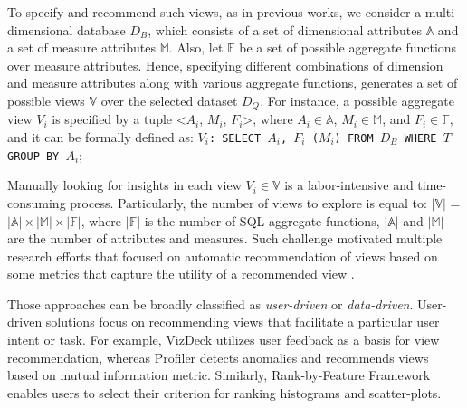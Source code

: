 To specify and recommend such views, as in previous works, we consider a multi-dimensional database $D_B$, which consists of a set of dimensional attributes $\mathbb{A}$ and a set of measure attributes $\mathbb{M}$. 
%
Also, let $\mathbb{F}$ be a set of possible aggregate functions over measure attributes. %
%
Hence, specifying different combinations of dimension and measure attributes along with various aggregate functions, generates a set of possible views $\mathbb{V}$ over the selected dataset $D_Q$.
%
For instance, a possible aggregate view $V_i$ is specified by a tuple <$ A_i$, $ M_i$, $ F_i$>, where $A_i \in \mathbb{A}$, $M_i \in \mathbb{M}$, and  $F_i \in \mathbb{F}$, and it can be formally defined as:
%
{\tt $V_i$: SELECT $A_i$, $F_i$ ($M_i$) FROM $D_B$ WHERE $T$ GROUP BY $A_i$};



%
Manually looking for insights in each view $V_i \in \mathbb{V}$ is a labor-intensive and time-consuming process. 
%
%
%
Particularly, the number of views to explore is equal to: $|\mathbb{V}|$ = $|\mathbb{A}| \times |\mathbb{M}| \times |\mathbb{F}|$, where $|\mathbb{F}|$ is the number of SQL aggregate functions, $|\mathbb{A}|$ and $|\mathbb{M}|$ are the number of attributes and measures. %
%
%
Such challenge motivated multiple research efforts that focused on automatic recommendation of views based on some metrics that capture the utility of a recommended view \cite{Key2012,Viegas2007,DBLP:journals/pvldb/SellamK16,DBLP:conf/ssdbm/SellamK16, Vartak2014,Vartak2015,Ehsan2016,kandel2012profiler,DBLP:journals/tvcg/SeoS06}. 
%

Those approaches can be broadly classified as {\em user-driven} or {\em data-driven}.
%
User-driven solutions focus on recommending views that facilitate a particular user intent or task. 
%
For example, VizDeck \cite{Key2012} utilizes user feedback as a basis for view recommendation, whereas Profiler \cite{kandel2012profiler} detects anomalies and recommends views based on mutual information metric.
%
Similarly, Rank-by-Feature Framework \cite{DBLP:journals/tvcg/SeoS06} enables users to select their criterion for ranking histograms and scatter-plots. 
%

